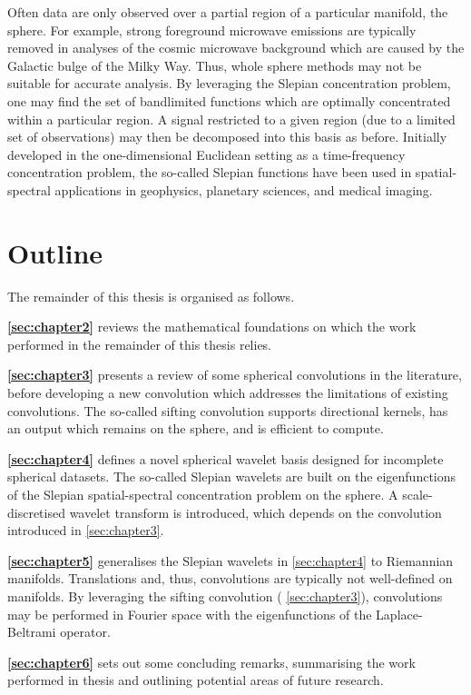 Often data are only observed over a partial region of a particular manifold, \ie{} the sphere.
For example, strong foreground microwave emissions are typically removed in analyses of the cosmic microwave background which are caused by the Galactic bulge of the Milky Way.
Thus, whole sphere methods may not be suitable for accurate analysis.
By leveraging the Slepian concentration problem, one may find the set of bandlimited functions which are optimally concentrated within a particular region.
A signal restricted to a given region (due to a limited set of observations) may then be decomposed into this basis as before.
Initially developed in the one-dimensional Euclidean setting as a time-frequency concentration problem, the so-called Slepian functions have been used in spatial-spectral applications in geophysics, planetary sciences, and medical imaging.

\section{Outline}

The remainder of this thesis is organised as follows.

\begin{hangparas}{24pt}{1}
	\textbf{\cref{sec:chapter2}} reviews the mathematical foundations on which the work performed in the remainder of this thesis relies.

	\textbf{\cref{sec:chapter3}} presents a review of some spherical convolutions in the literature, before developing a new convolution which addresses the limitations of existing convolutions.
	The so-called sifting convolution supports directional kernels, has an output which remains on the sphere, and is efficient to compute.

	\textbf{\cref{sec:chapter4}} defines a novel spherical wavelet basis designed for incomplete spherical datasets.
	The so-called Slepian wavelets are built on the eigenfunctions of the Slepian spatial-spectral concentration problem on the sphere.
	A scale-discretised wavelet transform is introduced, which depends on the convolution introduced in \cref{sec:chapter3}.

	\textbf{\cref{sec:chapter5}} generalises the Slepian wavelets in \cref{sec:chapter4} to Riemannian manifolds.
	Translations and, thus, convolutions are typically not well-defined on manifolds.
	By leveraging the sifting convolution (\cf{} \cref{sec:chapter3}), convolutions may be performed in Fourier space with the eigenfunctions of the Laplace-Beltrami operator.

	\textbf{\cref{sec:chapter6}} sets out some concluding remarks, summarising the work performed in thesis and outlining potential areas of future research.
\end{hangparas}
